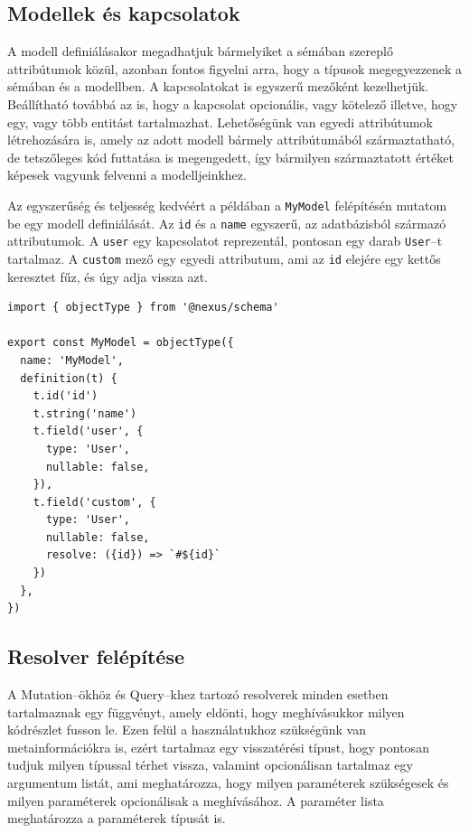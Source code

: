\subsection{Modellek és kapcsolatok}
A modell definiálásakor megadhatjuk bármelyiket a sémában szereplő attribútumok közül, azonban fontos figyelni arra, hogy a típusok megegyezzenek a sémában és a modellben.
A kapcsolatokat is egyszerű mezőként kezelhetjük. Beállítható továbbá az is, hogy a kapcsolat opcionális, vagy kötelező illetve, hogy egy, vagy több entitást tartalmazhat.
Lehetőségünk van egyedi attribútumok létrehozására is, amely az adott modell bármely attribútumából származtatható, de tetszőleges kód futtatása is megengedett, így bármilyen származtatott értéket képesek vagyunk felvenni a modelljeinkhez.

Az egyszerűség és teljesség kedvéért a példában a \lstinline|MyModel| felépítésén mutatom be egy modell definiálását.
Az \lstinline|id| és a \lstinline|name| egyszerű, az adatbázisból származó attributumok. A \lstinline|user| egy kapcsolatot reprezentál, pontosan egy darab \lstinline|User|–t tartalmaz. 
A \lstinline|custom| mező egy egyedi attributum, ami az \lstinline|id| elejére egy kettős keresztet fűz, és úgy adja vissza azt.
\begin{lstlisting}[style=ES6]
import { objectType } from '@nexus/schema'

export const MyModel = objectType({
  name: 'MyModel',
  definition(t) {
    t.id('id')
    t.string('name')
    t.field('user', {
      type: 'User',
      nullable: false,
    }),
    t.field('custom', {
      type: 'User',
      nullable: false,
      resolve: ({id}) => `#${id}`
    })
  },
})
\end{lstlisting}

\subsection{Resolver felépítése}
A Mutation–ökhöz és Query–khez tartozó resolverek minden esetben tartalmaznak egy függvényt, amely eldönti, hogy meghívásukkor milyen kódrészlet fusson le.
Ezen felül a használatukhoz szükségünk van metainformációkra is, ezért tartalmaz egy visszatérési típust, hogy pontosan tudjuk milyen típussal térhet vissza, valamint opcionálisan tartalmaz egy argumentum listát, ami meghatározza, hogy milyen paraméterek szükségesek és milyen paraméterek opcionálisak a meghívásához.
A paraméter lista meghatározza a paraméterek típusát is.

